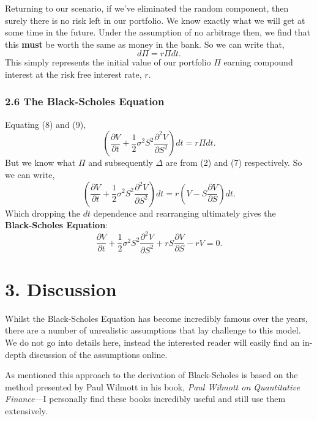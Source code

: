 \documentclass[11pt]{article}
\begin{document}
Returning to our scenario, if we've eliminated the random component, then surely there is no risk left in our portfolio. We know exactly what we will get at some time in the future. Under the assumption of no arbitrage then, we find that this \textbf{must} be worth the same as money in the bank. So we can write that,
\begin{equation}
    d\Pi = r \Pi dt.
\end{equation}
This simply represents the initial value of our portfolio $\Pi$ earning compound interest at the risk free interest rate, $r$.

\subsubsection*{2.6 The Black-Scholes Equation}
Equating (8) and (9),
\begin{equation}
    \left( \frac{\partial V}{\partial t} + \frac{1}{2} \sigma^2 S^2 \frac{\partial^2 V}{\partial S^2} \right) dt = r \Pi dt.
\end{equation}
But we know what $\Pi$ and subsequently $\Delta$ are from (2) and (7) respectively. So we can write,
\begin{equation}
    \left( \frac{\partial V}{\partial t} + \frac{1}{2} \sigma^2 S^2 \frac{\partial^2 V}{\partial S^2} \right) dt = r \left( V - S \frac{\partial V}{\partial S} \right) dt.
\end{equation}
Which dropping the $dt$ dependence and rearranging ultimately gives the \\ \textbf{Black-Scholes Equation}:
\begin{equation}
    \frac{\partial V}{\partial t} + \frac{1}{2} \sigma^2 S^2 \frac{\partial^2 V}{\partial S^2} + rS \frac{\partial V}{\partial S} - rV = 0.    
\end{equation}

\section*{3. Discussion}
Whilst the Black-Scholes Equation has become incredibly famous over the years, there are a number of unrealistic assumptions that lay challenge to this model. We do not go into details here, instead the interested reader will easily find an in-depth discussion of the assumptions online.

As mentioned this approach to the derivation of Black-Scholes is based on the method presented by Paul Wilmott in his book, \textit{Paul Wilmott on Quantitative Finance}––I personally find these books incredibly useful and still use them extensively. 
\end{document}
